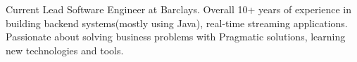 

\begin{cvparagraph}

Current Lead Software Engineer at Barclays. Overall 10+ years of experience in building backend systems(mostly using Java), real-time streaming applications. Passionate about solving business problems with Pragmatic solutions, learning new technologies and tools.
\end{cvparagraph}
